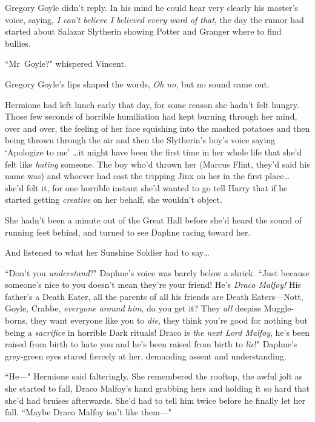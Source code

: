 Gregory Goyle didn't reply. In his mind he could hear very clearly his master's voice, saying, \emph{I can't believe I believed every word of that}, the day the rumor had started about Salazar Slytherin showing Potter and Granger where to find bullies.

``Mr~Goyle?" whispered Vincent.

Gregory Goyle's lips shaped the words, \emph{Oh no,} but no sound came out.

\later

Hermione had left lunch early that day, for some reason she hadn't felt hungry. Those few seconds of horrible humiliation had kept burning through her mind, over and over, the feeling of her face squishing into the mashed potatoes and then being thrown through the air and then the Slytherin's boy's voice saying `Apologize to me' {\ldots}it might have been the first time in her whole life that she'd felt like \emph{hating} someone. The boy who'd thrown her (Marcus Flint, they'd said his name was) and whoever had cast the tripping Jinx on her in the first place{\ldots} she'd felt it, for one horrible instant she'd wanted to go tell Harry that if he started getting \emph{creative} on her behalf, she wouldn't object.

She hadn't been a minute out of the Great Hall before she'd heard the sound of running feet behind, and turned to see Daphne racing toward her.

And listened to what her Sunshine Soldier had to say{\ldots}

``Don't you \emph{understand}?" Daphne's voice was barely below a shriek. ``Just because someone's nice to you doesn't mean they're your friend! He's \emph{Draco Malfoy!} His father's a Death Eater, all the parents of all his friends are Death Eaters—Nott, Goyle, Crabbe, \emph{everyone around him}, do you get it? They \emph{all} despise Muggle-borns, they want everyone like you to \emph{die}, they think you're good for nothing but being a \emph{sacrifice} in horrible Dark rituals! Draco is \emph{the next Lord Malfoy}, he's been raised from birth to hate you and he's been raised from birth to \emph{lie}!" Daphne's grey-green eyes stared fiercely at her, demanding assent and understanding.

``He—" Hermione said falteringly. She remembered the rooftop, the awful jolt as she started to fall, Draco Malfoy's hand grabbing hers and holding it so hard that she'd had bruises afterwards. She'd had to tell him twice before he finally let her fall. ``Maybe Draco Malfoy isn't like them—"

